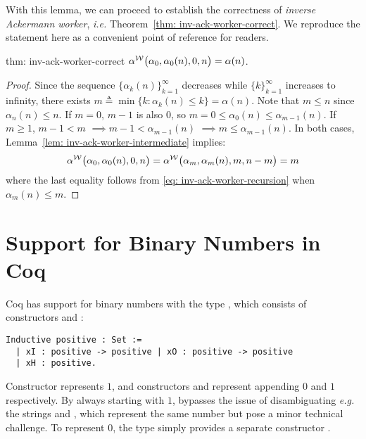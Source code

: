 With this lemma, we can proceed to establish the correctness of \emph{inverse Ackermann worker}, \emph{i.e.} Theorem~\ref{thm: inv-ack-worker-correct}. We reproduce the statement here as a convenient point of reference for readers.

\begin{usethmcounterof}{thm: inv-ack-worker-correct}
	$\alpha^{\mathcal{W}}\big(\alpha_0, \alpha_0(n), 0, n\big) = \alpha(n)$.
\end{usethmcounterof}

\begin{proof}
	Since the sequence $\big\{\alpha_k(n)\big\}_{k=1}^{\infty}$ decreases while $\{k\}_{k=1}^{\infty}$ increases to infinity, there exists $m \triangleq \min\big\{k : \alpha_k(n) \le k \} = \alpha(n)$. Note that $m\le n$ since $\alpha_n(n)\le n$.
	If $m = 0$, $m - 1$ is also $0$, so $m = 0 \le \alpha_0(n)\le \alpha_{m-1}(n)$. If $m \ge 1$, $m - 1 < m$ $\implies m - 1 < \alpha_{m-1}(n)$ $\implies m \le \alpha_{m-1}(n)$. In both cases, Lemma~\ref{lem: inv-ack-worker-intermediate} implies:
	$$ \alpha^{\mathcal{W}}\big(\alpha_0, \alpha_0(n), 0, n\big) = \alpha^{\mathcal{W}}\big(\alpha_m, \alpha_m(n), m, n - m\big) = m $$
	where the last equality follows from \eqref{eq: inv-ack-worker-recursion} when $\alpha_m(n)\le m$.
\end{proof}

\section{Support for Binary Numbers in Coq}
\label{apx:bin_in_coq}
Coq has support for binary numbers with the type , which consists
of constructors  and :

\begin{lstlisting}
Inductive positive : Set :=
  | xI : positive -> positive | xO : positive -> positive
  | xH : positive.
\end{lstlisting}

Constructor  represents $1$, and constructors  and  represent
appending $0$ and $1$ respectively.
By always starting with $1$,  bypasses
the issue of disambiguating \emph{e.g.} the strings  and
, which represent the same number but pose
a minor technical challenge.
To represent $0$, the type  simply provides a separate constructor .

